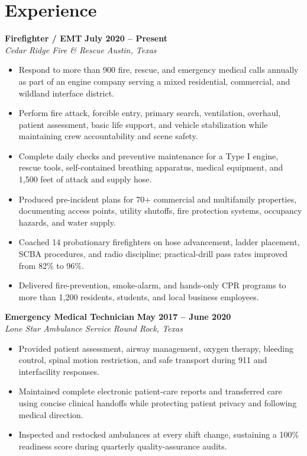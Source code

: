 \documentclass[10pt,letterpaper]{article}
\newcommand{\resumeentry}[4]{%
  \textbf{#1} \hfill \textbf{#2}\\[-0.05em]
  \textit{#3} \hfill \textit{#4}\par
}
\begin{document}
\section*{Experience}
\resumeentry{Firefighter / EMT}{July 2020 -- Present}{Cedar Ridge Fire \& Rescue}{Austin, Texas}
\begin{itemize}
  \item Respond to more than 900 fire, rescue, and emergency medical calls annually as part of an engine company serving a mixed residential, commercial, and wildland interface district.
  \item Perform fire attack, forcible entry, primary search, ventilation, overhaul, patient assessment, basic life support, and vehicle stabilization while maintaining crew accountability and scene safety.
  \item Complete daily checks and preventive maintenance for a Type I engine, rescue tools, self-contained breathing apparatus, medical equipment, and 1,500 feet of attack and supply hose.
  \item Produced pre-incident plans for 70+ commercial and multifamily properties, documenting access points, utility shutoffs, fire protection systems, occupancy hazards, and water supply.
  \item Coached 14 probationary firefighters on hose advancement, ladder placement, SCBA procedures, and radio discipline; practical-drill pass rates improved from 82\% to 96\%.
  \item Delivered fire-prevention, smoke-alarm, and hands-only CPR programs to more than 1,200 residents, students, and local business employees.
\end{itemize}

\resumeentry{Emergency Medical Technician}{May 2017 -- June 2020}{Lone Star Ambulance Service}{Round Rock, Texas}
\begin{itemize}
  \item Provided patient assessment, airway management, oxygen therapy, bleeding control, spinal motion restriction, and safe transport during 911 and interfacility responses.
  \item Maintained complete electronic patient-care reports and transferred care using concise clinical handoffs while protecting patient privacy and following medical direction.
  \item Inspected and restocked ambulances at every shift change, sustaining a 100\% readiness score during quarterly quality-assurance audits.
\end{itemize}
\end{document}
